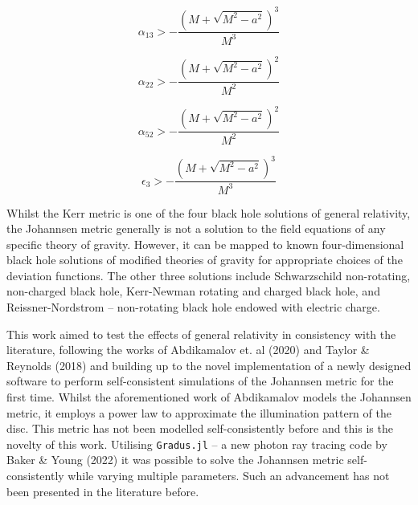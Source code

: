 \documentclass[fleqn,usenatbib,useAMS]{mnras}
\begin{document}
\begin{equation}
    \alpha_{13} > - \frac{(M + \sqrt{M^2-a^2})^3}{M^3}
    \label{alpha13}
\end{equation}

\begin{equation}
    \alpha_{22} > - \frac{(M + \sqrt{M^2-a^2})^2}{M^2}
    \label{alpha22}
\end{equation}

\begin{equation}
    \alpha_{52} > - \frac{(M + \sqrt{M^2-a^2})^2}{M^2}
    \label{alpha52}
\end{equation}

\begin{equation}
    \epsilon_{3} > - \frac{(M + \sqrt{M^2-a^2})^3}{M^3}
    \label{epsilon3}
\end{equation}

Whilst the Kerr metric is one of the four black hole solutions of general relativity, the Johannsen metric generally is not a solution to the field equations of any specific theory of gravity. However, it can be mapped to known four-dimensional black hole solutions of modified theories of gravity for appropriate choices of the deviation functions\cite{johannsen2013regular}.
The other three solutions include Schwarzschild non-rotating, non-charged black hole, Kerr-Newman rotating and charged black hole, and Reissner-Nordstrom -- non-rotating black hole endowed with electric charge.


This work aimed to test the effects of general relativity in consistency with the literature, following the works of Abdikamalov et. al (2020) \cite{abdikamalov2020testing} and Taylor \& Reynolds (2018) \cite{taylor2018exploring} and building up to the novel implementation of a newly designed software to perform self-consistent simulations of the Johannsen \cite{johannsen2013regular} metric for the first time. Whilst the aforementioned work of Abdikamalov models the Johannsen metric, it employs a power law to approximate the illumination pattern of the disc. This metric has not been modelled self-consistently before and this is the novelty of this work. Utilising {\tt Gradus.jl} -- a new photon ray tracing code by Baker \& Young (2022) \cite{baker2022} it was possible to solve the Johannsen metric self-consistently while varying multiple parameters. Such an advancement has not been presented in the literature before. 
\end{document}
